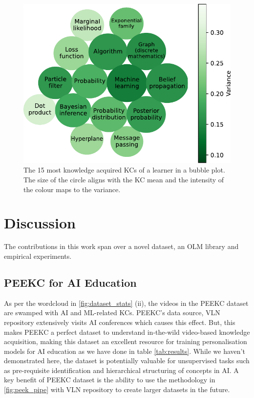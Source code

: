 \documentclass[letterpaper]{article} %
\begin{document}
\begin{figure}[]
\begin{center}
\centerline{\includegraphics[width=.7\linewidth]{visual_plot.pdf}}
 \caption{The 15 most knowledge acquired KCs of a learner in a bubble plot. The size of the circle aligns with the KC mean and the intensity of the colour maps to the variance.}
\label{fig:bubble}
\end{center}

\end{figure}



\section{Discussion}

The contributions in this work span over a novel dataset, an OLM library and empirical experiments.

\subsection{PEEKC for AI Education}
As per the wordcloud in \figurename{ \ref{fig:dataset_stats} (ii)}, the videos in the PEEKC dataset are swamped with AI and ML-related KCs. PEEKC's data source, VLN repository extensively visits AI conferences which causes this effect. But, this makes PEEKC a perfect dataset to understand in-the-wild video-based knowledge acquisition, making this dataset an excellent resource for training personalisation models for AI education as we have done in table \ref{tab:results}. While we haven't demonstrated here, the dataset is potentially valuable for unsupervised tasks such as pre-requisite identification and hierarchical structuring of concepts in AI. A key benefit of PEEKC dataset is the ability to use the methodology in \figurename{ \ref{fig:peek_pipe}} with VLN repository to create larger datasets in the future.
\end{document}
